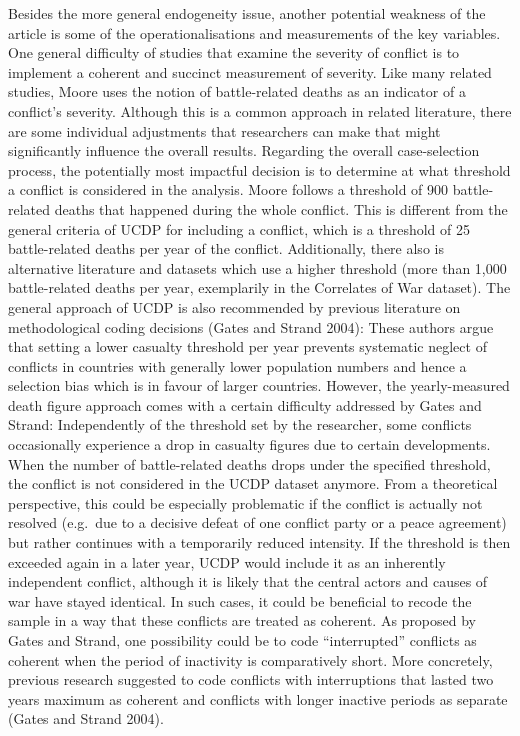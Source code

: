 \documentclass[
]{article}
\begin{document}
Besides the more general endogeneity issue, another potential weakness
of the article is some of the operationalisations and measurements of
the key variables. One general difficulty of studies that examine the
severity of conflict is to implement a coherent and succinct measurement
of severity. Like many related studies, Moore uses the notion of
battle-related deaths as an indicator of a conflict's severity. Although
this is a common approach in related literature, there are some
individual adjustments that researchers can make that might
significantly influence the overall results. Regarding the overall
case-selection process, the potentially most impactful decision is to
determine at what threshold a conflict is considered in the analysis.
Moore follows a threshold of 900 battle-related deaths that happened
during the whole conflict. This is different from the general criteria
of UCDP for including a conflict, which is a threshold of 25
battle-related deaths per year of the conflict. Additionally, there also
is alternative literature and datasets which use a higher threshold
(more than 1,000 battle-related deaths per year, exemplarily in the
Correlates of War dataset). The general approach of UCDP is also
recommended by previous literature on methodological coding decisions
(Gates and Strand 2004): These authors argue that setting a lower
casualty threshold per year prevents systematic neglect of conflicts in
countries with generally lower population numbers and hence a selection
bias which is in favour of larger countries. However, the
yearly-measured death figure approach comes with a certain difficulty
addressed by Gates and Strand: Independently of the threshold set by the
researcher, some conflicts occasionally experience a drop in casualty
figures due to certain developments. When the number of battle-related
deaths drops under the specified threshold, the conflict is not
considered in the UCDP dataset anymore. From a theoretical perspective,
this could be especially problematic if the conflict is actually not
resolved (e.g.~due to a decisive defeat of one conflict party or a peace
agreement) but rather continues with a temporarily reduced intensity. If
the threshold is then exceeded again in a later year, UCDP would include
it as an inherently independent conflict, although it is likely that the
central actors and causes of war have stayed identical. In such cases,
it could be beneficial to recode the sample in a way that these
conflicts are treated as coherent. As proposed by Gates and Strand, one
possibility could be to code ``interrupted'' conflicts as coherent when
the period of inactivity is comparatively short. More concretely,
previous research suggested to code conflicts with interruptions that
lasted two years maximum as coherent and conflicts with longer inactive
periods as separate (Gates and Strand 2004).
\end{document}
